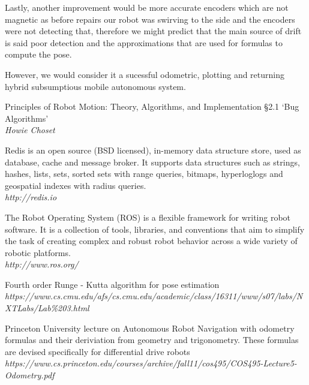 \documentclass[11pt, a4paper]{article}
\begin{document}
Lastly, another improvement would be more accurate encoders which are not magnetic as before repairs
our robot was swirving to the side and the encoders were not detecting that, therefore we might predict
that the main source of drift is said poor detection and the approximations that are used for formulas
to compute the pose.


However, we would consider it a sucessful odometric, plotting and returning hybrid subsumptious 
mobile autonomous system. 



\newpage
\begin{thebibliography}{9}

\par{Principles of Robot Motion: Theory, Algorithms, and Implementation \S2.1 `Bug Algorithms'}\\
\textit{Howie Choset}

\par{Redis is an open source (BSD licensed), in-memory data structure store, used as database, cache and message broker. It supports data structures such as strings, hashes, lists, sets, sorted sets with range queries, bitmaps, hyperloglogs and geospatial indexes with radius queries.}\\
\textit{http://redis.io}

\par{The Robot Operating System (ROS) is a flexible framework for writing robot software. It is a collection of tools, libraries, and conventions that aim to simplify the task of creating complex and robust robot behavior across a wide variety of robotic platforms.}\\
\textit{http://www.ros.org/}

\par{Fourth order Runge - Kutta algorithm for pose estimation} \\
\textit{https://www.cs.cmu.edu/afs/cs.cmu.edu/academic/class/16311/www/s07/labs/NXTLabs/Lab\%203.html}

\par{Princeton University lecture on Autonomous Robot Navigation with odometry formulas and their deriviation from geometry and trigonometry. These formulas are devised specifically for differential drive robots} \\
\textit{https://www.cs.princeton.edu/courses/archive/fall11/cos495/COS495-Lecture5-Odometry.pdf }


\end{thebibliography}
\end{document}
